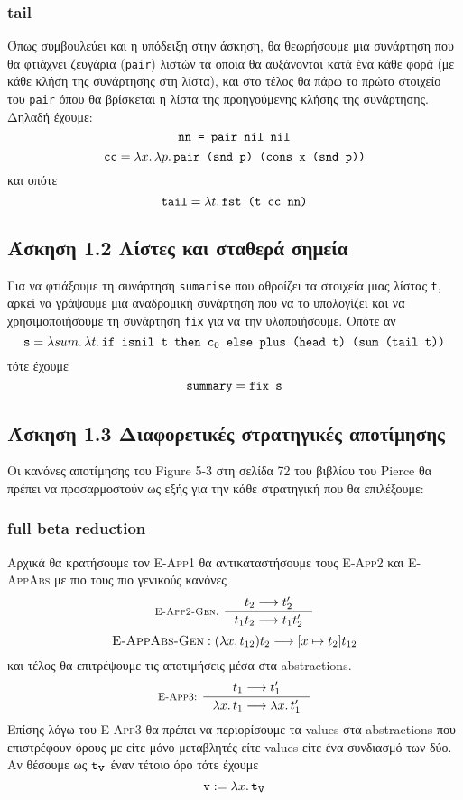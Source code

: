 \documentclass[a4paper,11pt]{article}
\newcommand\nlambda[1]{\ensuremath{\lambda #1.\,}}
\newcommand\nred{\ensuremath{\longrightarrow}}
\begin{document}
\subsubsection*{tail}
Όπως συμβουλεύει και η υπόδειξη στην άσκηση, θα θεωρήσουμε μια συνάρτηση που θα φτιάχνει ζευγάρια (\verb|pair|) λιστών τα οποία θα αυξάνονται κατά ένα κάθε φορά (με κάθε κλήση της συνάρτησης στη λίστα), και στο τέλος θα πάρω το πρώτο στοιχείο του \verb|pair| όπου θα βρίσκεται η λίστα της προηγούμενης κλήσης της συνάρτησης. Δηλαδή έχουμε:
\[\verb|nn = pair nil nil|\]
\[\verb|cc| = \nlambda{x} \nlambda{p} \verb|pair (snd p) (cons x (snd p))|\]
και οπότε
\[\verb|tail| = \nlambda{t} \verb|fst (t cc nn)|\]


\subsection*{Άσκηση 1.2 Λίστες και σταθερά σημεία}

Για να φτιάξουμε τη συνάρτηση \verb|sumarise| που αθροίζει τα στοιχεία μιας λίστας \verb|t|, αρκεί να γράψουμε μια αναδρομική συνάρτηση που να το υπολογίζει και να χρησιμοποιήσουμε τη συνάρτηση \verb|fix| για να την υλοποιήσουμε. Οπότε αν
\[\verb|s| = \nlambda{sum} \nlambda{t} \verb|if isnil t then c|_0\verb| else plus (head t) (sum (tail t))|\]
τότε έχουμε
\[\verb|summary| = \verb|fix s|\]


\subsection*{Άσκηση 1.3 Διαφορετικές στρατηγικές αποτίμησης}
Οι κανόνες αποτίμησης του Figure 5-3 στη σελίδα 72 του βιβλίου του Pierce θα πρέπει να προσαρμοστούν ως εξής για την κάθε στρατηγική που θα επιλέξουμε:

\subsubsection*{full beta reduction}
Αρχικά θα κρατήσουμε τον \textsc{E-App1} θα αντικαταστήσουμε τους \textsc{E-App2} και \textsc{E-AppAbs} με πιο τους πιο γενικούς κανόνες
\[
  \inference[\textsc{E-App2-Gen}: ]{%
    t_2 \nred t'_2
  }{%
    t_1 t_2 \nred t_1 t'_2
  }
\]
\[
  \textsc{E-AppAbs-Gen}: (\nlambda{x} t_{12}) t_2 \nred [x \mapsto t_2] t_{12}
\]
και τέλος θα επιτρέψουμε τις αποτιμήσεις μέσα στα abstractions.
\[
  \inference[\textsc{E-App3}: ]{%
    t_1 \nred t'_1
  }{%
    \nlambda{x} t_1 \nred \nlambda{x} t'_1
  }
\]
Επίσης λόγω του \textsc{E-App3} θα πρέπει να περιορίσουμε τα values στα abstractions που επιστρέφουν όρους με είτε μόνο μεταβλητές είτε values είτε ένα συνδιασμό των δύο.
Αν θέσουμε ως $\verb|t|_{\verb|v|}$ έναν τέτοιο όρο τότε έχουμε
\[
  \verb|v| := \nlambda{x} \verb|t|_{\verb|v|}
\]
\end{document}
